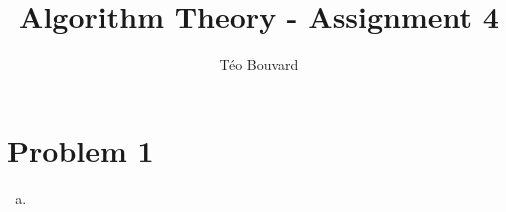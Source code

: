 \documentclass[a4paper, 10pt, twoside]{article}
\begin{document}
\title{Algorithm Theory - Assignment 4}
\author{T\'eo Bouvard}
\maketitle

\section*{Problem 1}
\begin{enumerate}[a)]
    \item 
\end{enumerate}
\end{document}

